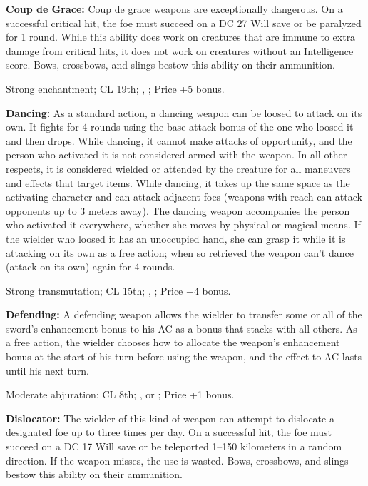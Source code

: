 \textbf{Coup de Grace:} Coup de grace weapons are exceptionally dangerous. On a successful critical hit, the foe must succeed on a DC 27 Will save or be paralyzed for 1 round. While this ability does work on creatures that are immune to extra damage from critical hits, it does not work on creatures without an Intelligence score. Bows, crossbows, and slings bestow this ability on their ammunition.

Strong enchantment; CL 19th; , ; Price +5 bonus.


\textbf{Dancing:} As a standard action, a dancing weapon can be loosed to attack on its own. It fights for 4 rounds using the base attack bonus of the one who loosed it and then drops. While dancing, it cannot make attacks of opportunity, and the person who activated it is not considered armed with the weapon. In all other respects, it is considered wielded or attended by the creature for all maneuvers and effects that target items. While dancing, it takes up the same space as the activating character and can attack adjacent foes (weapons with reach can attack opponents up to 3 meters away). The dancing weapon accompanies the person who activated it everywhere, whether she moves by physical or magical means. If the wielder who loosed it has an unoccupied hand, she can grasp it while it is attacking on its own as a free action; when so retrieved the weapon can't dance (attack on its own) again for 4 rounds.

Strong transmutation; CL 15th; , ; Price +4 bonus.


\textbf{Defending:} A defending weapon allows the wielder to transfer some or all of the sword's enhancement bonus to his AC as a bonus that stacks with all others. As a free action, the wielder chooses how to allocate the weapon's enhancement bonus at the start of his turn before using the weapon, and the effect to AC lasts until his next turn.

Moderate abjuration; CL 8th; ,  or ; Price +1 bonus.


\textbf{Dislocator:} The wielder of this kind of weapon can attempt to dislocate a designated foe up to three times per day. On a successful hit, the foe must succeed on a DC 17 Will save or be teleported 1--150 kilometers in a random direction. If the weapon misses, the use is wasted. Bows, crossbows, and slings bestow this ability on their ammunition.

